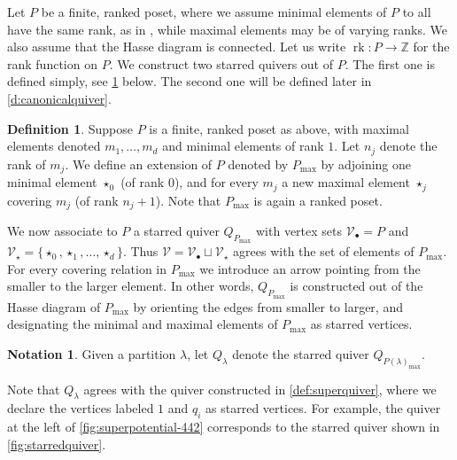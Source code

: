 \documentclass{amsart}
\theoremstyle{definition}
\newtheorem{defn}[thm]{Definition}
\newtheorem{notation}[thm]{Notation}
\numberwithin{equation}{section}
\newcommand{\V}{\mathcal{V}}
\newcommand{\rk}{\operatorname{rk}}
\newcommand{\Z}{\mathbb{Z}}
\begin{document}
Let $P$ be a finite, ranked poset, where we assume minimal elements of $P$ to all have the same rank, as in \cite{RWReflexive}, while maximal elements may be of varying ranks. 
We also assume that the Hasse diagram is connected. Let us write $\rk:P\to\Z$ for the rank function on $P$. We construct two starred quivers out of $P$. The first one is defined simply, see \cref{d:QPmax} below. The second one will be defined later in \cref{d:canonicalquiver}.

\begin{defn}\label{d:QPmax}
Suppose $P$ is a finite, ranked poset as above, with maximal elements denoted $m_1,\dotsc, m_d$ and minimal elements of rank $1$. Let $n_j$ denote the rank of $m_j$. We define an extension of $P$ denoted by $P_{\max}$ by adjoining one minimal element $\star_0$ (of rank $0$), and for every $m_j$ a new maximal element $\star_j$ covering $m_j$ (of rank $n_j+1$). Note that $P_{\max}$ is again a ranked poset. 

We now associate to $P$ a starred quiver $Q_{P_{\max}}$ with vertex sets $\V_\bullet=P$ and $\V_\star=\{\star_0,\star_1,\dotsc,\star_d\}$. 
Thus $\V=\V_\bullet\sqcup\V_\star$ agrees with the set of elements of  $P_{\max}$. For every covering relation in $P_{\max}$ we introduce an arrow pointing from the smaller to the larger element. In other words, $Q_{P_{\max}}$ is constructed out of the Hasse diagram of $P_{\max}$ by orienting the edges from smaller to larger, and designating the minimal and maximal elements of $P_{\max}$ as starred vertices.     
\end{defn}

\begin{notation}\label{notation:Q}
Given a partition $\lambda$,  let 
$Q_\lambda$ denote the starred quiver
	$Q_{P(\lambda)_{\max}}$.
\end{notation}

Note that $Q_\lambda$ agrees with the quiver constructed in \cref{def:superquiver}, where we declare the vertices labeled $1$ and $q_i$ as starred vertices. 
For example, the quiver at the left of 
\cref{fig:superpotential-442} corresponds to the starred quiver shown in  \cref{fig:starredquiver}.
 
\end{document}
